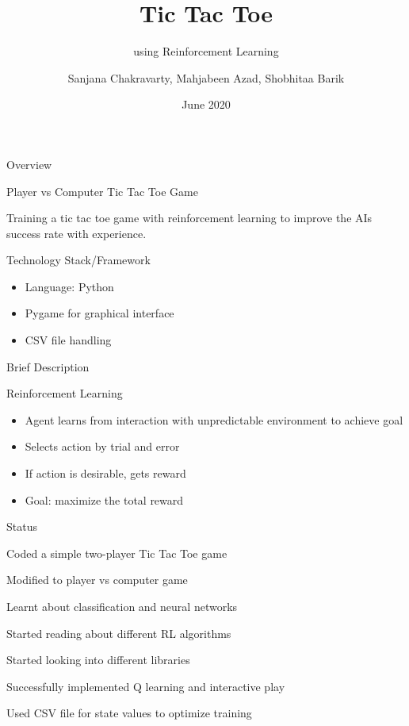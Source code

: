 \documentclass[14pt]{beamer}
\title[WTEF 2020]{Tic Tac Toe}
\subtitle{using Reinforcement Learning}
\author[Group 12]{Sanjana Chakravarty, Mahjabeen Azad, Shobhitaa Barik}
\date{June 2020}
\begin{document}
\begin{frame}
    \titlepage
\end{frame}

\begin{frame}{Overview}
    \begin{center}
        \textcolor{myAmber}{Player vs Computer Tic Tac Toe Game}
    \end{center}
   
    \begin{center}
    Training a tic tac toe game with reinforcement learning to improve the AI\textquotesingle s success rate with experience.
    \end{center}
\end{frame}

\begin{frame}{Technology Stack/Framework}
        \begin{itemize}
            \item Language: Python
            \item Pygame for graphical interface 
            \item CSV file handling
        \end{itemize}
\end{frame}

\begin{frame}{Brief Description}
    \begin{block}{Reinforcement Learning}        
        \begin{itemize}
            \item<1-> Agent learns from interaction with unpredictable environment to achieve goal
            \item<2-> Selects action by trial and error
            \item<3-> If action is desirable, gets reward
            \item<4-> Goal: maximize the total reward
        \end{itemize}
    \end{block}
\end{frame}

\begin{frame}{Status}
    \begin{description}[STATUS]
        \item[\color{myPink}{24 June}] Coded a simple two-player Tic Tac Toe game
        \item[\color{myPink}{27 June}] Modified to player vs computer game
        \item[\color{myPink}{28 June}] Learnt about classification and neural networks
        \item[\color{myPink}{29 June}] Started reading about different RL algorithms
        \item[\color{myPink}{04 July}] Started looking into different libraries
        \item[\color{myPink}{11 July}] Successfully implemented Q learning and interactive play
        \item[\color{myPink}{12 July}] Used CSV file for state values to optimize training
    \end{description}
\end{frame}
\end{document}
